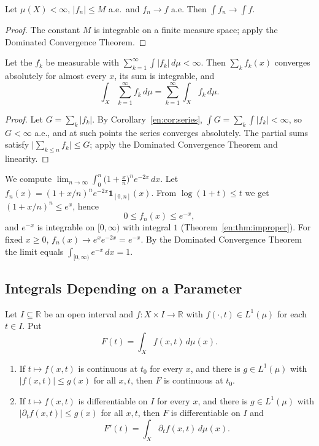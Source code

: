 \documentclass[11pt]{article}
\makeatletter
\newcommand{\envlabel}[1]{\protected@edef\@currentlabel{\themathenv}\label{#1}}
\makeatother
\begin{document}
\begin{corollary}\envlabel{en:cor:bct}
Let $\mu(X)<\infty$, $|f_{n}|\leq M$ a.e.\ and $f_{n}\to f$ a.e. Then $\int f_{n}\to\int f$.
\end{corollary}

\begin{proof}
The constant $M$ is integrable on a finite measure space; apply the Dominated Convergence Theorem.
\end{proof}

\begin{corollary}\envlabel{en:cor:series2}
Let the $f_{k}$ be measurable with $\sum_{k=1}^{\infty}\int|f_{k}|\,d\mu<\infty$. Then $\sum_{k}f_{k}(x)$ converges absolutely for almost every $x$, its sum is integrable, and
\[
\int_{X}\sum_{k=1}^{\infty}f_{k}\,d\mu=\sum_{k=1}^{\infty}\int_{X}f_{k}\,d\mu.
\]
\end{corollary}

\begin{proof}
Let $G=\sum_{k}|f_{k}|$. By Corollary~\ref{en:cor:series}, $\int G=\sum_{k}\int|f_{k}|<\infty$, so $G<\infty$ a.e., and at such points the series converges absolutely. The partial sums satisfy $\big|\sum_{k\leq n}f_{k}\big|\leq G$; apply the Dominated Convergence Theorem and linearity.
\end{proof}

\begin{example}
We compute $\displaystyle\lim_{n\to\infty}\int_{0}^{n}\Big(1+\frac{x}{n}\Big)^{n}e^{-2x}\,dx$. Let $f_{n}(x)=(1+x/n)^{n}e^{-2x}\mathbf{1}_{[0,n]}(x)$. From $\log(1+t)\leq t$ we get $(1+x/n)^{n}\leq e^{x}$, hence
\[
0\leq f_{n}(x)\leq e^{-x},
\]
and $e^{-x}$ is integrable on $[0,\infty)$ with integral $1$ (Theorem~\ref{en:thm:improper}). For fixed $x\geq0$, $f_{n}(x)\to e^{x}e^{-2x}=e^{-x}$. By the Dominated Convergence Theorem the limit equals $\int_{[0,\infty)}e^{-x}\,dx=1$.
\end{example}

\subsection{Integrals Depending on a Parameter}

\begin{theorem}\envlabel{en:thm:param}
Let $I\subseteq\mathbb{R}$ be an open interval and $f:X\times I\to\mathbb{R}$ with $f(\cdot,t)\in L^{1}(\mu)$ for each $t\in I$. Put
\[
F(t)=\int_{X}f(x,t)\,d\mu(x).
\]
\begin{enumerate}
  \item If $t\mapsto f(x,t)$ is continuous at $t_{0}$ for every $x$, and there is $g\in L^{1}(\mu)$ with $|f(x,t)|\leq g(x)$ for all $x,t$, then $F$ is continuous at $t_{0}$.
  \item If $t\mapsto f(x,t)$ is differentiable on $I$ for every $x$, and there is $g\in L^{1}(\mu)$ with $|\partial_{t}f(x,t)|\leq g(x)$ for all $x,t$, then $F$ is differentiable on $I$ and
  \[
  F'(t)=\int_{X}\partial_{t}f(x,t)\,d\mu(x).
  \]
\end{enumerate}
\end{theorem}
\end{document}
